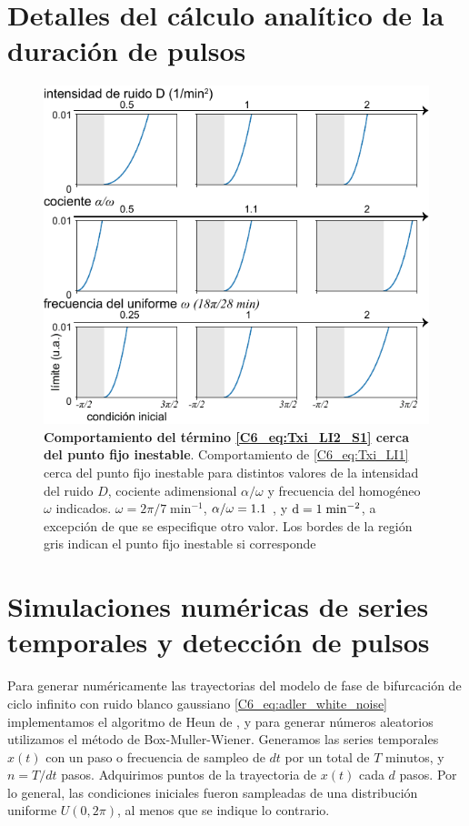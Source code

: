 \documentclass[./main.tex]{subfiles}
\begin{document}
\begin{subappendices}
\chapter{Detalles del cálculo analítico de la duración de pulsos}

\begin{figure}
    \centering
    \includegraphics[width=1\columnwidth]{figures/chapter6/C6_limite_int_2.pdf} 
    \caption{\textbf{Comportamiento del término \ref{C6_eq:Txi_LI2_S1} cerca del punto fijo inestable}. Comportamiento de \ref{C6_eq:Txi_LI1} cerca del punto fijo inestable \xxi para distintos valores de la intensidad del ruido $D$, cociente adimensional $\alpha/\omega$ y frecuencia del homogéneo $\omega$ indicados. $\omega = 2\pi/7 \;\text{min}^{-1}$, $\alpha/\omega = 1.1$ , y $\mathrm{d} = 1 \;\text{min}^{-2}$, a excepción de que se especifique otro valor. Los bordes de la región gris indican el punto fijo inestable si corresponde}
    \label{C6_fig:Txi_LI2_S2}
\end{figure}

\chapter{Simulaciones numéricas de series temporales y detección de pulsos}
\label{C6_ap:traces}
\label{C7_ap:OU_OUD_traces}

Para generar numéricamente las trayectorias del modelo de fase de bifurcación de ciclo infinito con ruido blanco gaussiano \ref{C6_eq:adler_white_noise} implementamos el algoritmo de Heun de \cite{SanMiguel2000}, y para generar números aleatorios utilizamos el método de Box-Muller-Wiener. Generamos las series temporales $x(t)$ con un paso o frecuencia de sampleo de $dt$ por un total de $T$ minutos, y $n = T/dt $ pasos. Adquirimos puntos de la trayectoria de $x(t)$ cada $d$ pasos. Por lo general, las condiciones iniciales fueron sampleadas de una distribución uniforme $U(0,2\pi)$, al menos que se indique lo contrario. 



\end{subappendices}
\end{document}
